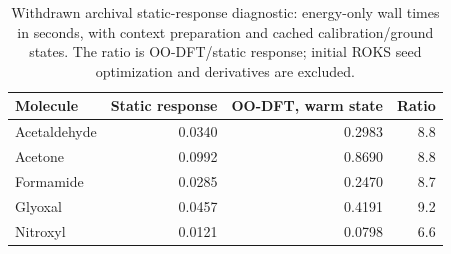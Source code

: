 \begin{table}[!htbp]
\centering\small
\caption{Withdrawn archival static-response diagnostic: energy-only wall times in seconds, with context preparation and cached calibration/ground states. The ratio is OO-DFT/static response; initial ROKS seed optimization and derivatives are excluded.}\label{tab:timing}
\begin{tabular}{lrrr}
\toprule
Molecule & Static response & OO-DFT, warm state & Ratio \\
\midrule
Acetaldehyde & 0.0340 & 0.2983 & 8.8 \\
Acetone & 0.0992 & 0.8690 & 8.8 \\
Formamide & 0.0285 & 0.2470 & 8.7 \\
Glyoxal & 0.0457 & 0.4191 & 9.2 \\
Nitroxyl & 0.0121 & 0.0798 & 6.6 \\
\bottomrule
\end{tabular}
\end{table}
